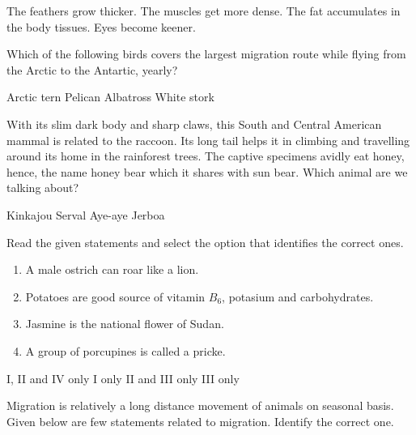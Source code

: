 \begin{questions}
    \begin{randomizechoices}
        \choice The feathers grow thicker.
        \choice The muscles get more dense.
        \CorrectChoice The fat accumulates in the body tissues.
        \choice Eyes become keener.
    \end{randomizechoices}

    \question Which of the following birds covers the largest migration route while flying from the Arctic to the Antartic, yearly?

    \begin{randomizeoneparchoices}
        \CorrectChoice Arctic tern
        \choice Pelican
        \choice Albatross
        \choice White stork
    \end{randomizeoneparchoices}

    \question With its slim dark body and sharp claws, this South and Central American mammal is related to the raccoon. Its long tail helps it in climbing and travelling around its home in the rainforest trees. The captive specimens avidly eat honey, hence, the name honey bear which it shares with sun bear. Which animal are we talking about?

    \begin{randomizeoneparchoices}
        \CorrectChoice Kinkajou
        \choice Serval
        \choice Aye-aye
        \choice Jerboa
    \end{randomizeoneparchoices}

    \question Read the given statements and select the option that identifies the correct ones.
    \begin{enumerate}[align=left,label=\Roman*.]
        \item A male ostrich can roar like a lion.
        \item Potatoes are good source of vitamin \(B_6\), potasium and carbohydrates.
        \item Jasmine is the national flower of Sudan.
        \item A group of porcupines is called a pricke.
    \end{enumerate}

    \begin{randomizeoneparchoices}
        \CorrectChoice I, II and IV only
        \choice I only
        \choice II and III only
        \choice III only
    \end{randomizeoneparchoices}

    \question Migration is relatively a long distance movement of animals on seasonal basis. Given below are few statements related to migration. Identify the correct one.


\end{questions}
